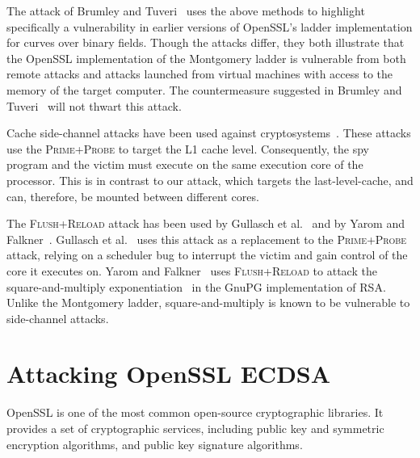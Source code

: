 \documentclass[twocolumn]{svjour3}
\begin{document}
The attack of Brumley and Tuveri~\cite{brumley11remote} uses the above methods to highlight specifically a vulnerability in earlier versions of OpenSSL's ladder implementation for curves over binary fields. %
Though the attacks differ, they both illustrate that the OpenSSL implementation of the Montgomery ladder is vulnerable from both remote attacks and attacks launched from virtual machines with access to the memory of the target computer. 
The countermeasure suggested in Brumley and Tuveri~\cite{brumley11remote} will not thwart this attack.

Cache side-channel attacks have been used against cryptosystems~\cite{aciicmez07yet,aciicmez10new,aciicmez08vulnerability,chen13improvement,canteaut06understanding,tromer10efficient,zhang12cross}.
These attacks use the \textsc{Prime+Probe} to target the L1 cache level.
Consequently, the spy program and the victim must execute on the same execution core of the processor.
This is in contrast to our attack, which targets the last-level-cache, and can, therefore, be mounted between different cores.

The \textsc{Flush+Reload} attack has been used by Gullasch et al.~\cite{gullasch11cache} and by Yarom and Falkner~\cite{yarom13flush}.
Gullasch et al.~\cite{gullasch11cache} uses this attack as a replacement to the \textsc{Prime+Probe} attack,
relying on a scheduler bug to interrupt the victim and gain control of the core it executes on.
Yarom and Falkner~\cite{yarom13flush} uses \textsc{Flush+Reload} to attack the square-and-multiply exponentiation~\cite{gordon98survey} 
in the GnuPG implementation of RSA.
Unlike the Montgomery ladder, square-and-multiply is known to be vulnerable to side-channel attacks.


\section{Attacking OpenSSL ECDSA}\label{sec:attack}
OpenSSL is one of the most common open-source cryptographic libraries.
It provides a set of cryptographic services, including public key and symmetric encryption 
algorithms, and public key signature algorithms.
\end{document}
